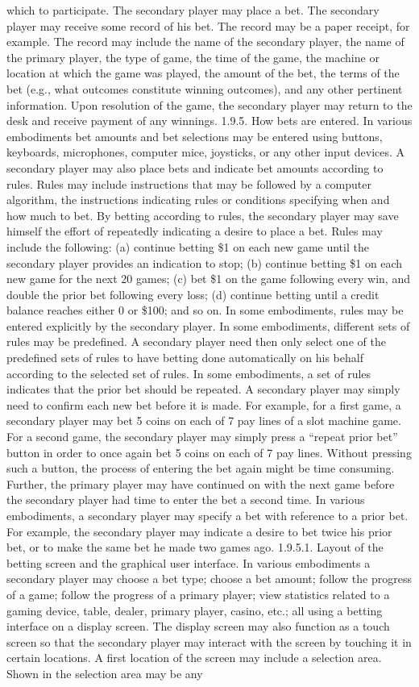 \documentclass[11pt,a4paper]{article}
\begin{document}
which to participate. The secondary player may place a bet. The secondary player may receive some record of his bet. The record may be a paper receipt, for example. The record may include the name of the secondary player, the name of the primary player, the type of game, the time of the game, the machine or location at which the game was played, the amount of the bet, the terms of the bet (e.g., what outcomes constitute winning outcomes), and any other pertinent information. Upon resolution of the game, the secondary player may return to the desk and receive payment of any winnings. 1.9.5. How bets are entered. In various embodiments bet amounts and bet selections may be entered using buttons, keyboards, microphones, computer mice, joysticks, or any other input devices. A secondary player may also place bets and indicate bet amounts according to rules. Rules may include instructions that may be followed by a computer algorithm, the instructions indicating rules or conditions specifying when and how much to bet. By betting according to rules, the secondary player may save himself the effort of repeatedly indicating a desire to place a bet. Rules may include the following: (a) continue betting \$1 on each new game until the secondary player provides an indication to stop; (b) continue betting \$1 on each new game for the next 20 games; (c) bet \$1 on the game following every win, and double the prior bet following every loss; (d) continue betting until a credit balance reaches either 0 or \$100; and so on. In some embodiments, rules may be entered explicitly by the secondary player. In some embodiments, different sets of rules may be predefined. A secondary player need then only select one of the predefined sets of rules to have betting done automatically on his behalf according to the selected set of rules. In some embodiments, a set of rules indicates that the prior bet should be repeated. A secondary player may simply need to confirm each new bet before it is made. For example, for a first game, a secondary player may bet 5 coins on each of 7 pay lines of a slot machine game. For a second game, the secondary player may simply press a “repeat prior bet” button in order to once again bet 5 coins on each of 7 pay lines. Without pressing such a button, the process of entering the bet again might be time consuming. Further, the primary player may have continued on with the next game before the secondary player had time to enter the bet a second time. In various embodiments, a secondary player may specify a bet with reference to a prior bet. For example, the secondary player may indicate a desire to bet twice his prior bet, or to make the same bet he made two games ago. 1.9.5.1. Layout of the betting screen and the graphical user interface. In various embodiments a secondary player may choose a bet type; choose a bet amount; follow the progress of a game; follow the progress of a primary player; view statistics related to a gaming device, table, dealer, primary player, casino, etc.; all using a betting interface on a display screen. The display screen may also function as a touch screen so that the secondary player may interact with the screen by touching it in certain locations. A first location of the screen may include a selection area. Shown in the selection area may be any 
\end{document}
